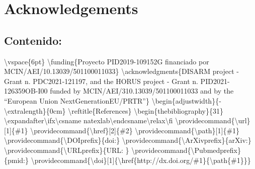 \documentclass{article}%
\begin{document}
%
\clearpage%
\section{Acknowledgements}%
\label{sec:Acknowledgements}%
\subsection{Contenido:}%
\label{subsec:Contenido}%
\textbackslash{}vspace\{6pt\}\newline%
\newline%
\textbackslash{}funding\{Proyecto PID2019{-}109152G financiado por MCIN/AEI/10.13039/501100011033\}\newline%
\newline%
\textbackslash{}acknowledgments\{DISARM project {-} Grant n. PDC2021{-}121197, and the HORUS project {-} Grant n. PID2021{-}126359OB{-}I00 funded by MCIN/AEI/310.13039/501100011033 and by the “European Union NextGenerationEU/PRTR”\}\newline%
\newline%
\textbackslash{}begin\{adjustwidth\}\{{-}\textbackslash{}extralength\}\{0cm\}\newline%
\newline%
\textbackslash{}reftitle\{References\}\newline%
\newline%
\textbackslash{}begin\{thebibliography\}\{31\}\newline%
\textbackslash{}expandafter\textbackslash{}ifx\textbackslash{}csname natexlab\textbackslash{}endcsname\textbackslash{}relax\textbackslash{}fi\newline%
\textbackslash{}providecommand\{\textbackslash{}url\}{[}1{]}\{\#1\}\newline%
\textbackslash{}providecommand\{\textbackslash{}href\}{[}2{]}\{\#2\}\newline%
\textbackslash{}providecommand\{\textbackslash{}path\}{[}1{]}\{\#1\}\newline%
\textbackslash{}providecommand\{\textbackslash{}DOIprefix\}\{doi:\}\newline%
\textbackslash{}providecommand\{\textbackslash{}ArXivprefix\}\{arXiv:\}\newline%
\textbackslash{}providecommand\{\textbackslash{}URLprefix\}\{URL: \}\newline%
\textbackslash{}providecommand\{\textbackslash{}Pubmedprefix\}\{pmid:\}\newline%
\textbackslash{}providecommand\{\textbackslash{}doi\}{[}1{]}\{\textbackslash{}href\{http://dx.doi.org/\#1\}\{\textbackslash{}path\{\#1\}\}\}\newline%
\end{document}
